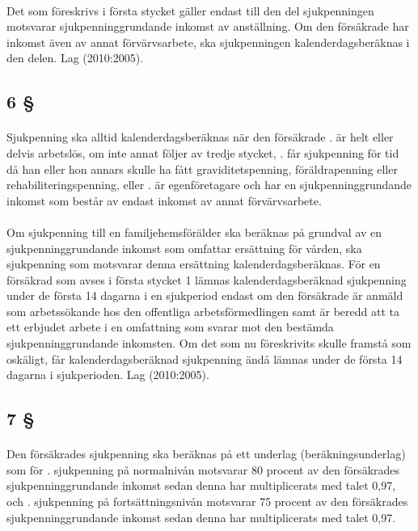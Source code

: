 \documentclass[a4paper,notitlepage,openany,10pt]{book}
\begin{document}
\paragraph*{}
Det som föreskrivs i första stycket gäller endast till den del sjukpenningen motsvarar sjukpenninggrundande inkomst av anställning. Om den försäkrade har inkomst även av annat förvärvsarbete, ska sjukpenningen kalenderdagsberäknas i den delen.
Lag (2010:2005).
\subsection*{6 §}
\paragraph*{}
Sjukpenning ska alltid kalenderdagsberäknas när den försäkrade
. är helt eller delvis arbetslös, om inte annat följer av tredje stycket,
. får sjukpenning för tid då han eller hon annars skulle ha fått graviditetspenning, föräldrapenning eller rehabiliteringspenning, eller
. är egenföretagare och har en sjukpenninggrundande inkomst som består av endast inkomst av annat förvärvsarbete.
\paragraph*{}
Om sjukpenning till en familjehemsförälder ska beräknas på grundval av en sjukpenninggrundande inkomst som omfattar ersättning för vården, ska sjukpenning som motsvarar denna ersättning kalenderdagsberäknas.
För en försäkrad som avses i första stycket 1 lämnas kalenderdagsberäknad sjukpenning under de första 14 dagarna i en sjukperiod endast om den försäkrade är anmäld som arbetssökande hos den offentliga arbetsförmedlingen samt är beredd att ta ett erbjudet arbete i en omfattning som svarar mot den bestämda sjukpenninggrundande inkomsten. Om det som nu föreskrivits skulle framstå som oskäligt, får kalenderdagsberäknad sjukpenning ändå lämnas under de första 14 dagarna i sjukperioden.
Lag (2010:2005).
\subsection*{7 §}
\paragraph*{}
Den försäkrades sjukpenning ska beräknas på ett underlag (beräkningsunderlag) som för
. sjukpenning på normalnivån motsvarar 80 procent av den försäkrades sjukpenninggrundande inkomst sedan denna har multiplicerats med talet 0,97, och
. sjukpenning på fortsättningsnivån motsvarar 75 procent av den försäkrades sjukpenninggrundande inkomst sedan denna har multiplicerats med talet 0,97.
\end{document}
